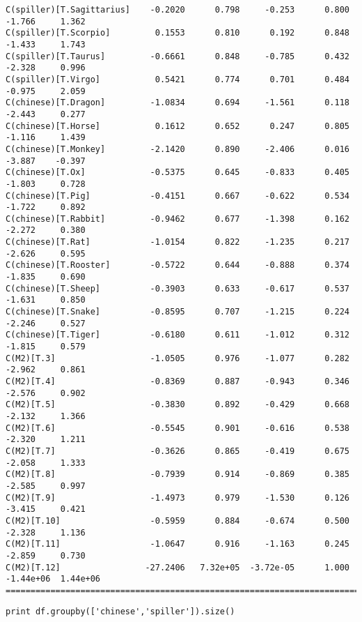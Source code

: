 \documentclass[12pt,fleqn]{article}\usepackage{../common}
\begin{document}
\begin{verbatim}
C(spiller)[T.Sagittarius]    -0.2020      0.798     -0.253      0.800        -1.766     1.362
C(spiller)[T.Scorpio]         0.1553      0.810      0.192      0.848        -1.433     1.743
C(spiller)[T.Taurus]         -0.6661      0.848     -0.785      0.432        -2.328     0.996
C(spiller)[T.Virgo]           0.5421      0.774      0.701      0.484        -0.975     2.059
C(chinese)[T.Dragon]         -1.0834      0.694     -1.561      0.118        -2.443     0.277
C(chinese)[T.Horse]           0.1612      0.652      0.247      0.805        -1.116     1.439
C(chinese)[T.Monkey]         -2.1420      0.890     -2.406      0.016        -3.887    -0.397
C(chinese)[T.Ox]             -0.5375      0.645     -0.833      0.405        -1.803     0.728
C(chinese)[T.Pig]            -0.4151      0.667     -0.622      0.534        -1.722     0.892
C(chinese)[T.Rabbit]         -0.9462      0.677     -1.398      0.162        -2.272     0.380
C(chinese)[T.Rat]            -1.0154      0.822     -1.235      0.217        -2.626     0.595
C(chinese)[T.Rooster]        -0.5722      0.644     -0.888      0.374        -1.835     0.690
C(chinese)[T.Sheep]          -0.3903      0.633     -0.617      0.537        -1.631     0.850
C(chinese)[T.Snake]          -0.8595      0.707     -1.215      0.224        -2.246     0.527
C(chinese)[T.Tiger]          -0.6180      0.611     -1.012      0.312        -1.815     0.579
C(M2)[T.3]                   -1.0505      0.976     -1.077      0.282        -2.962     0.861
C(M2)[T.4]                   -0.8369      0.887     -0.943      0.346        -2.576     0.902
C(M2)[T.5]                   -0.3830      0.892     -0.429      0.668        -2.132     1.366
C(M2)[T.6]                   -0.5545      0.901     -0.616      0.538        -2.320     1.211
C(M2)[T.7]                   -0.3626      0.865     -0.419      0.675        -2.058     1.333
C(M2)[T.8]                   -0.7939      0.914     -0.869      0.385        -2.585     0.997
C(M2)[T.9]                   -1.4973      0.979     -1.530      0.126        -3.415     0.421
C(M2)[T.10]                  -0.5959      0.884     -0.674      0.500        -2.328     1.136
C(M2)[T.11]                  -1.0647      0.916     -1.163      0.245        -2.859     0.730
C(M2)[T.12]                 -27.2406   7.32e+05  -3.72e-05      1.000     -1.44e+06  1.44e+06
=============================================================================================
\end{verbatim}

\begin{verbatim}
print df.groupby(['chinese','spiller']).size()
\end{verbatim}
\end{document}
